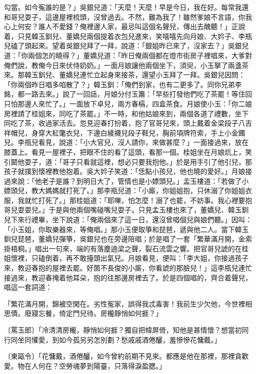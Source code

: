 勾當。如今寃誰的是？」吳銀兒道：「天麼！天麼！早是今日，我在好。每常我還和哥兒耍子，這邊屋裡梳頭，沒曾過去。不然，難為我了！雖然爹娘不言語，你我心上何安？誰人不愛錢？俺裡邊人家，最忌叫這個名聲兒，傳出去醜聽！」正說着，只見韓玉釧兒、董嬌兒兩個提着衣包兒進來，笑嘻嘻先向月娘、大妗子、李瓶兒磕了頭起來。望着吳銀兒拜了一拜，說道：「銀姐昨已來了，沒家去？」吳銀兒道：「你兩個怎的曉得？」董嬌兒道：「昨日俺兩個都在燈巿街房子裡唱來，大爹對俺們說，教俺今日來伏侍奶奶。」一面月娘讓他兩個坐下，須臾，小玉拏了兩盞茶來。那韓玉釧兒、董嬌兒連忙立起身來接茶，還望小玉拜了一拜。吳銀兒因問：「你兩個昨日唱多咱散了？」韓玉釧：「俺們到家，也有二更多了。同你兄弟李銘，都一路去來。」說了一回話，月娘分付玉簫：「早些打發他們吃了茶罷！等住回只怕那邊人來忙了。」一面放下卓兒，兩方春槅，四盒茶食。月娘使小玉：「你二娘房裡請了桂姐來，同吃了茶罷。」不一時，和他姑娘來到，兩個各道了禮數，坐下同吃了茶，收過家活去。忽見迎春打扮着，抱了官哥兒來，頭上戴着金梁段子八吉祥帽兒，身穿大紅氅衣兒，下邊白綾襪兒段子鞋兒，胸前項牌符索，手上小金鐲兒。李瓶兒看見，說道：「小大官兒，沒人請你，來做甚麼？」一面接過來，放在膝蓋上。看見一屋裡子，把眼不住的看了這頭，看那一個。桂姐坐在月娘炕上，笑引鬬他耍子，道：「哥子只看就這裡，想必只要我抱他。」於是用手引了他引兒，那孩子就撲到懷裡教他抱着。吳大妗子笑道：「恁點小孩兒，他也曉的愛好。」月娘接過來說：「他老子是誰？到明日大了，管情也是小嫖頭兒。」孟玉樓道：「若做了小嫖頭兒，教大媽媽就打死了。」那李瓶兒道：「小廝，你姐姐抱，只休溺了你姐姐衣服，我就忙打死了。」那桂姐道：「耶嚛，怕怎麼！溺了也罷，不妨事。我心裡要抱哥兒耍耍兒。」于是與他兩個嘴碰嘴兒耍子。只見孟玉樓也來了，董嬌兒、韓玉釧兒下來行禮畢，坐下說道：「俺兩個來了這一日，還沒曾唱個兒與娘們聽。」因叫：「小玉姐，你取樂器來，等俺唱。」那小玉便取箏和琵琶，遞與他二人。當下韓玉釧兒琵琶，董嬌兒彈箏，吳銀兒也在旁邊陪唱；於是唱了一套「繁華滿月開，金索掛梧桐。」唱出一句來，端的有落塵遶梁之聲，裂石流雲之響。把官哥兒諕的在桂姐懷裡，只磕倒着，再不敢擡頭出氣兒。月娘看見，便叫：「李大姐，你接過孩子來，教迎春抱的屋裡去罷。好箇不長俊的小廝，你看諕的那臉兒！」這李瓶兒連忙接過來，教迎春掩着他耳朵，抱的往那邊房裡去了。於是四個唱的，齊合着聲兒，唱這一套詞道：

「繁花滿月開，錦被空閑在。劣性寃家，誤得我忒毒害！我前生少欠他，今世裡相思債。廢寢忘餐，倚定門兒待。房櫳靜悄如何捱？」

〔罵玉郎〕「冷清清房櫳，靜悄如何捱？獨自把幃屏倚，知他是甚情懷？想當初同行同坐同懽愛，到如今孤另另怎別劃？愁戚戚酒倦釃，羞慘慘花慵戴。」

〔東甌令〕「花慵戴，酒倦釃，如今曾約前期不見來。都應是他在那裡，那裡貪歡愛。物在人何在？空勞魂夢到陽臺，只落得淚盈腮。」


